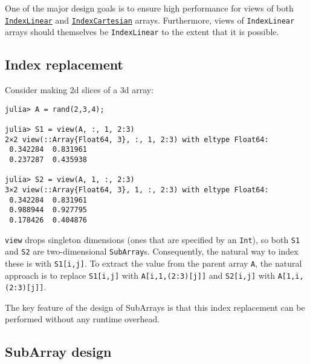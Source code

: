 One of the major design goals is to ensure high performance for views of both \hyperlink{1761039776681330940}{\texttt{IndexLinear}} and \hyperlink{4052302263500310575}{\texttt{IndexCartesian}} arrays. Furthermore, views of \texttt{IndexLinear} arrays should themselves be \texttt{IndexLinear} to the extent that it is possible.



\hypertarget{5581126844733696350}{}


\subsection{Index replacement}



Consider making 2d slices of a 3d array:






\begin{verbatim}
julia> A = rand(2,3,4);

julia> S1 = view(A, :, 1, 2:3)
2×2 view(::Array{Float64, 3}, :, 1, 2:3) with eltype Float64:
 0.342284  0.831961
 0.237287  0.435938

julia> S2 = view(A, 1, :, 2:3)
3×2 view(::Array{Float64, 3}, 1, :, 2:3) with eltype Float64:
 0.342284  0.831961
 0.988944  0.927795
 0.178426  0.404876
\end{verbatim}





\texttt{view} drops {\textquotedbl}singleton{\textquotedbl} dimensions (ones that are specified by an \texttt{Int}), so both \texttt{S1} and \texttt{S2} are two-dimensional \texttt{SubArray}s. Consequently, the natural way to index these is with \texttt{S1[i,j]}. To extract the value from the parent array \texttt{A}, the natural approach is to replace \texttt{S1[i,j]} with \texttt{A[i,1,(2:3)[j]]} and \texttt{S2[i,j]} with \texttt{A[1,i,(2:3)[j]]}.



The key feature of the design of SubArrays is that this index replacement can be performed without any runtime overhead.



\hypertarget{2778530023624514912}{}


\subsection{SubArray design}



